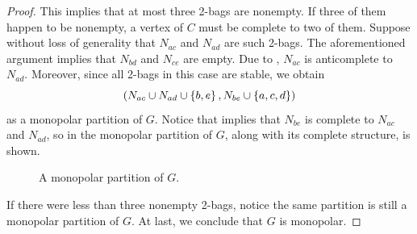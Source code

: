 \begin{proof}
    This implies that at most three 2-bags are nonempty. If three of them happen
    to be nonempty, a vertex of $C$ must be complete to two of them. Suppose
    without loss of generality that $N_{ac}$ and $N_{ad}$ are such 2-bags. The
    aforementioned argument implies that $N_{bd}$ and $N_{ce}$ are empty. Due to
    , $N_{ac}$ is anticomplete to $N_{ad}$. Moreover,
    since all 2-bags in this case are stable, we obtain
    \[
        \left(N_{ac} \cup N_{ad} \cup \left\{b,e\right\} , N_{be} \cup \left\{a,c,d\right\}\right)
    \]
    as a monopolar partition of $G$. Notice that  implies
    that $N_{be}$ is complete to $N_{ac}$ and $N_{ad}$, so in
     the monopolar partition of $G$, along with
    its complete structure, is shown.
    
    \begin{figure}[htb!]
        \centering
        \caption{A monopolar partition of $G$.}
        \label{fig:monopolar_partition_5}
    \end{figure}

    If there were less than three nonempty 2-bags, notice the same partition is
    still a monopolar partition of $G$. At last, we conclude that $G$ is
    monopolar.
    
\end{proof}

